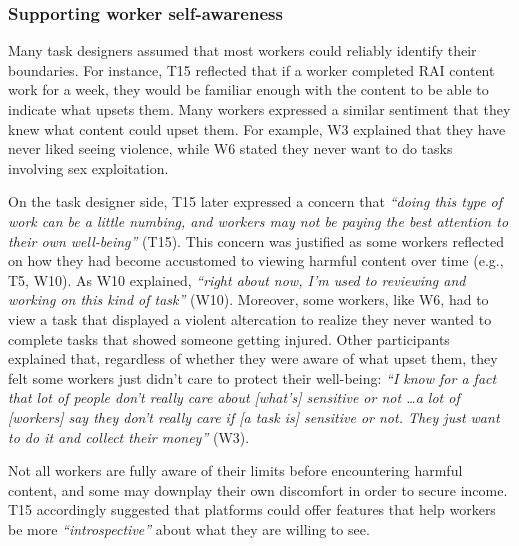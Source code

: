 \subsubsection{Supporting worker self-awareness}
Many task designers assumed that most workers could reliably identify their boundaries. For instance, T15 reflected that if a worker completed RAI content work for a week, they would be familiar enough with the content to be able to indicate what upsets them. Many workers expressed a similar sentiment that they knew what content could upset them. For example, W3 explained that they have never liked seeing violence, while W6 stated they never want to do tasks involving sex exploitation. 

On the task designer side, T15 later expressed a concern that \textit{``doing this type of work can be a little numbing, and workers may not be paying the best attention to their own well-being''} (T15). This concern was justified as some  workers reflected on how they had become accustomed to viewing harmful content over time (e.g., T5, W10). As W10 explained, \textit{``right about now, I'm used to reviewing and working on this kind of task''} (W10). Moreover, some workers, like W6, had to view a task that displayed a violent altercation to realize they never wanted to complete tasks that showed someone getting injured. Other participants explained that, regardless of whether they were aware of what upset them, they felt some workers just didn't care to protect their well-being: \textit{``I know for a fact that lot of people don't really care about [what's] sensitive or not \dots a lot of [workers] say they don't really care if [a task is] sensitive or not. They just want to do it and collect their money''} (W3). 

 Not all workers are fully aware of their limits before encountering harmful content, and some may downplay their own discomfort in order to secure income. T15 accordingly suggested that platforms could offer features that help workers be more \textit{``introspective''} about what they are willing to see. 

